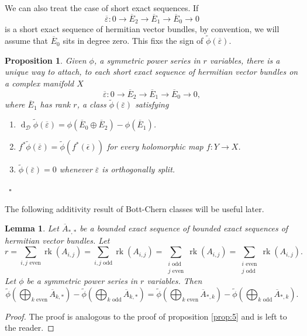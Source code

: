 \documentclass[10pt,twoside]{article}
\numberwithin{equation}{section}
\theoremstyle{plain}
\newtheorem{proposition}[equation]{Proposition}
\newtheorem{lemma}[equation]{Lemma}
\theoremstyle{definition}
\DeclareMathOperator{\dd}{d}
\DeclareMathOperator{\rk}{rk}
\begin{document}
We can also treat the case of short exact
sequences. If
 $$\overline{\varepsilon}\colon 0 \longrightarrow
\overline{E}_{2} \longrightarrow \overline{E}_{1}
\longrightarrow \overline{E}_{0} \longrightarrow 0$$
is a short exact sequence of hermitian vector bundles, by convention, we
will assume that $\overline{E}_{0}$ sits in degree zero.
This fixs the sign of $\widetilde \phi(\overline{\varepsilon})$. 

\begin{proposition} \label{prop:20}
  Given $\phi$, a symmetric power series in $r$
  variables, 
  there is a unique way to attach, to each short exact sequence of
  hermitian vector bundles 
  on a complex manifold $X$
  $$\overline{\varepsilon}\colon 0 \longrightarrow
  \overline{E}_{2} \longrightarrow \overline{E}_{1}
  \longrightarrow \overline{E}_{0} \longrightarrow 0,$$
  where $\overline E_{1}$ has rank $r$, a class
  $\widetilde
  {\phi}(\overline{\varepsilon })$ satisfying
  \begin{enumerate}
  \item $\dd_{\mathcal{D}}\widetilde \phi (\overline{\varepsilon })
    =\phi (\overline E_{0}\oplus \overline E_{2})-\phi
    (\overline E_{1})$.
  \item $f^{\ast}\widetilde \phi (\overline{\varepsilon })=\widetilde \phi
    (f^{\ast}(\overline{\epsilon }))$ for every holomorphic map
    $f\colon Y\longrightarrow X$.
  \item $\widetilde \phi (\overline {\varepsilon })=0$ whenever
    $\overline{\varepsilon }$ is orthogonally split. 
  \end{enumerate}
\ \hfill $\square$
\end{proposition}





The following additivity result of Bott-Chern classes will be useful
later. 

\begin{lemma} \label{lemm:1}
  Let $\overline A_{\ast,\ast}$ be a bounded exact sequence of bounded
  exact 
  sequences of 
  hermitian vector bundles. Let 
  $$r=\sum_{i, j \text{ even} }\rk(A_{i,j})
  =\sum_{i, j \text{ odd} }\rk(A_{i,j})
  =\sum_{\substack{i \text{ odd}\\ j \text{ even}} }\rk(A_{i,j})
  =\sum_{\substack{i\text{ even}\\j  \text{ odd}} }\rk(A_{i,j}).
  $$
  Let $\phi $ be a symmetric power series in $r$ variables. Then 
  \begin{displaymath}
    \widetilde {\phi }(\bigoplus_{k \text{ even} }
    \overline A_{k,\ast})-
    \widetilde {\phi }(\bigoplus_{k \text{ odd} }\overline 
    A_{k,\ast})=
    \widetilde {\phi }(\bigoplus_{k \text{ even} }\overline 
    A_{\ast,k})-
    \widetilde {\phi }(\bigoplus_{k \text{ odd} }\overline 
    A_{\ast,k}).
  \end{displaymath}
\end{lemma}
\begin{proof}
  The proof is analogous to the proof of proposition \ref{prop:5} and
  is left to the reader.
\end{proof}
\end{document}
